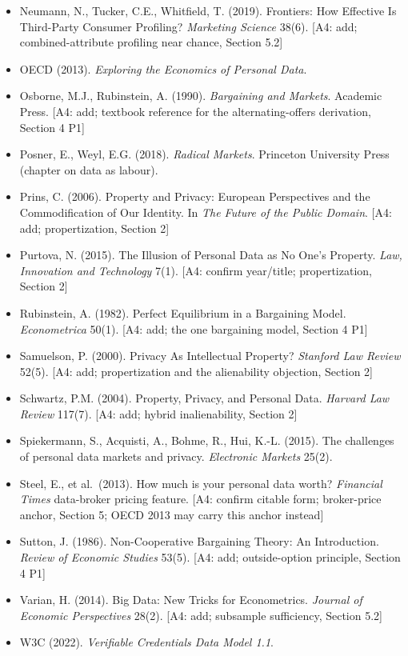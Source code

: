 \documentclass[
  11pt,
]{article}
\begin{document}
\begin{itemize}
  Nash, J. (1950). The Bargaining Problem. \emph{Econometrica} 18(2).
  {[}A4: add; cooperative solution named as the frictionless limit,
  Section 4 P1{]}
\item
  Neumann, N., Tucker, C.E., Whitfield, T. (2019). Frontiers: How
  Effective Is Third-Party Consumer Profiling? \emph{Marketing Science}
  38(6). {[}A4: add; combined-attribute profiling near chance, Section
  5.2{]}
\item
  OECD (2013). \emph{Exploring the Economics of Personal Data}.
\item
  Osborne, M.J., Rubinstein, A. (1990). \emph{Bargaining and Markets}.
  Academic Press. {[}A4: add; textbook reference for the
  alternating-offers derivation, Section 4 P1{]}
\item
  Posner, E., Weyl, E.G. (2018). \emph{Radical Markets}. Princeton
  University Press (chapter on data as labour).
\item
  Prins, C. (2006). Property and Privacy: European Perspectives and the
  Commodification of Our Identity. In \emph{The Future of the Public
  Domain}. {[}A4: add; propertization, Section 2{]}
\item
  Purtova, N. (2015). The Illusion of Personal Data as No One's
  Property. \emph{Law, Innovation and Technology} 7(1). {[}A4: confirm
  year/title; propertization, Section 2{]}
\item
  Rubinstein, A. (1982). Perfect Equilibrium in a Bargaining Model.
  \emph{Econometrica} 50(1). {[}A4: add; the one bargaining model,
  Section 4 P1{]}
\item
  Samuelson, P. (2000). Privacy As Intellectual Property? \emph{Stanford
  Law Review} 52(5). {[}A4: add; propertization and the alienability
  objection, Section 2{]}
\item
  Schwartz, P.M. (2004). Property, Privacy, and Personal Data.
  \emph{Harvard Law Review} 117(7). {[}A4: add; hybrid inalienability,
  Section 2{]}
\item
  Spiekermann, S., Acquisti, A., Bohme, R., Hui, K.-L. (2015). The
  challenges of personal data markets and privacy. \emph{Electronic
  Markets} 25(2).
\item
  Steel, E., et al.~(2013). How much is your personal data worth?
  \emph{Financial Times} data-broker pricing feature. {[}A4: confirm
  citable form; broker-price anchor, Section 5; OECD 2013 may carry this
  anchor instead{]}
\item
  Sutton, J. (1986). Non-Cooperative Bargaining Theory: An Introduction.
  \emph{Review of Economic Studies} 53(5). {[}A4: add; outside-option
  principle, Section 4 P1{]}
\item
  Varian, H. (2014). Big Data: New Tricks for Econometrics.
  \emph{Journal of Economic Perspectives} 28(2). {[}A4: add; subsample
  sufficiency, Section 5.2{]}
\item
  W3C (2022). \emph{Verifiable Credentials Data Model 1.1}.
\end{itemize}
\end{document}
